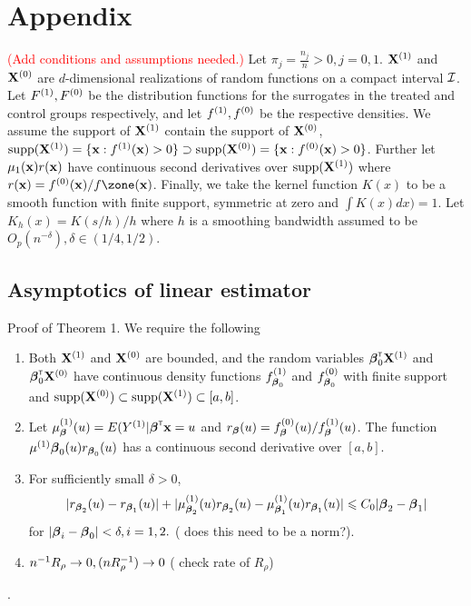 \documentclass[useAMS,usenatbib,referee]{biom}
\def\Isc{{\cal I}}
\begin{document}
\section{Appendix}
\textcolor{red}{(Add conditions and assumptions needed.)}
Let $\pi_j = \frac{n_j}{n} > 0, j = 0,1$. ${\bf X}^{(1)}$ and ${\bf X}^{(0)}$ are $d$-dimensional realizations of random functions on a compact interval $\Isc$. Let $F^{(1)}, F^{(0)}$ be the distribution functions for the surrogates in the treated and control groups respectively, and let $f^{(1)}, f^{(0)}$ be the respective densities. We assume the support of ${\bf X}^{(1)}$ contain the support of ${\bf X}^{(0)}$, $\text{supp}({\bf X}^{(1)}) = \{{\bf x} : f^{(1)}({\bf x}) > 0\} \supset \text{supp}({\bf X}^{(0)}) = \{{\bf x} : f^{(0)}({\bf x}) > 0\}$. Further {\color{red} let $\mu_1({\bf x})r({\bf x})$ have continuous second derivatives over $\text{supp}({\bf X}^{(1)})$} where $r(\bx) = f\szero(\bx)/f\zone(\bx)$. Finally, we take the kernel function $K(x)$ to be a smooth function with finite support, symmetric at zero and $\int K(x)dx) = 1$. Let $K_h(x) = K(s/h)/h$ where $h$ is a smoothing bandwidth assumed to be $O_p(n^{-\delta}), \delta \in (1/4, 1/2)$. 

\subsection{Asymptotics of linear estimator}
Proof of Theorem 1. We require the following
\begin{enumerate}
    \item Both ${\bf X}^{(1)}$ and ${\bf X}^{(0)}$ are bounded, and the random variables $\boldsymbol{\beta}_0^{{\sf \scriptscriptstyle{T}}}{\bf X}^{(1)}$ and $\boldsymbol{\beta}_0^{{\sf \scriptscriptstyle{T}}}{\bf X}^{(0)}$ have continuous density functions $f^{(1)}_{\boldsymbol{\beta}_0}$ and $f^{(0)}_{\boldsymbol{\beta}_0}$ with finite support and $\text{supp}({\bf X}^{(0)}) \subset \text{supp}({\bf X}^{(1)}) \subset [a,b]$. 
    \item Let $\mu^{(1)}_{\boldsymbol{\beta}}(u) = E(Y^{(1)} | \boldsymbol{\beta}^{{\sf \scriptscriptstyle{T}}}{\bf x} = u$ and $r_{\boldsymbol{\beta}}(u) = f^{(0)}_{\boldsymbol{\beta}}(u) / f^{(1)}_{\boldsymbol{\beta}}(u)$. The function $\mu^{(1)}{\boldsymbol{\beta}_0}(u)r_{\boldsymbol{\beta}_0}(u)$ has a continuous second derivative over $[a,b]$.
    \item For sufficiently small $\delta > 0$,
    \begin{align*}
        |r_{\boldsymbol{\beta}_2}(u) - r_{\boldsymbol{\beta}_1}(u)| + |\mu_{\boldsymbol{\beta}_2}^{(1)}(u)r_{\boldsymbol{\beta}_2}(u) - \mu_{\boldsymbol{\beta}_1}^{(1)}(u)r_{\boldsymbol{\beta}_1}(u)| \leqslant C_0|\boldsymbol{\beta}_2 - \boldsymbol{\beta}_1|
    \end{align*}
    for $|\boldsymbol{\beta}_i - \boldsymbol{\beta}_0| < \delta, i = 1,2.$ ({\color{red} does this need to be a norm?}).
    \item $n^{-1} R_\rho \rightarrow 0, (nR_\rho^{-1}) \rightarrow 0$ ({\color{red} check rate of $R_\rho$})
\end{enumerate}.
\end{document}
